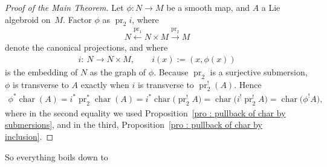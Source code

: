 \documentclass[pdftex]{sigma}
\numberwithin{equation}{section}
\newcommand{\rmap}{\longrightarrow}
\newcommand{\lmap}{\longleftarrow}
\newcommand{\pr}{\operatorname{pr}}
\newcommand{\8}{\infty}
\begin{document}
\begin{proof}[Proof of the Main Theorem] Let $\phi \colon N \to M$ be a smooth map, and $A$ a Lie algebroid on~$M$. Factor $\phi$ as $\pr_2i$, where
\begin{gather*}
N \stackrel{\pr_1}{\lmap} N \times M \stackrel{\pr_2}{\rmap} M
\end{gather*}denote the canonical projections, and where
\begin{gather*}
 i\colon \ N \rmap N \times M, \qquad i(x):=(x,\phi(x))
\end{gather*}is the embedding of $N$ as the graph of $\phi$. Because $\pr_2$ is a surjective submersion, $\phi$ is transverse to $A$ exactly when $i$ is transverse to $\pr_2^!(A)$. Hence
\begin{align*}
 \phi^*\operatorname{char}(A) = i^*\pr_2^*\operatorname{char}(A) = i^*\operatorname{char}\big(\pr_2^!A\big) = \operatorname{char}\big(i^!\pr_2^!A\big) = \operatorname{char}\big(\phi^!A\big),
\end{align*}where in the second equality we used Proposition~\ref{pro : pullback of char by submersions}, and in the third, Proposition~\ref{pro : pullback of char by inclusion}.
\end{proof}

So everything boils down to
\end{document}
